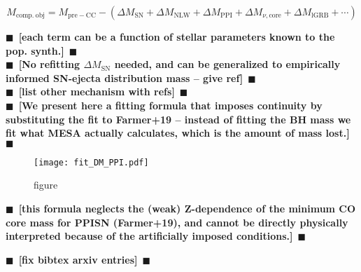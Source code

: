 \documentclass[twocolumn]{aastex63}
\newcommand{\todo}[1]{{\large $\blacksquare$~\textbf{\color{red}[#1]}}~$\blacksquare$}
\begin{document}
\begin{equation}
  \label{eq:mass}
  M_\mathrm{comp.\ obj} = M_\mathrm{pre-CC} - \left(\Delta M_\mathrm{SN} + \Delta M_\mathrm{NLW} + \Delta M_\mathrm{PPI} + \Delta M_{\nu, \mathrm{core}} +\Delta M_\mathrm{lGRB} + \cdots \right)
\end{equation}

\todo{each term can be a function of stellar parameters known to the
  pop. synth.}\\

\todo{No refitting $\Delta M_\mathrm{SN}$ needed, and can be
  generalized to empirically informed SN-ejecta distribution mass --
  give ref}\\

\todo{list other mechanism with refs}\\

\todo{We present here a fitting formula that imposes continuity by
  substituting the fit to Farmer+19 -- instead of fitting the BH mass
  we fit what MESA actually calculates, which is the amount of mass
  lost.}

\begin{figure}[ht!]
    \begin{centering}
      \texttt{[image: fit\_DM\_PPI.pdf]}
        \caption{figure }
        \label{fig:fit_DM_PPI}
    \end{centering}
\end{figure}

\todo{this formula neglects the (weak) Z-dependence of the minimum CO
  core mass for PPISN (Farmer+19), and cannot be directly physically
  interpreted because of the artificially imposed conditions.}

\todo{fix bibtex arxiv entries}
% 

\end{document}

